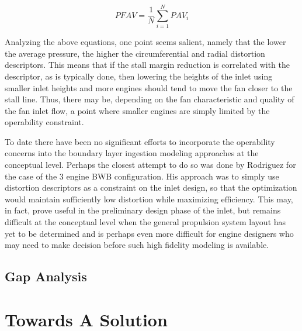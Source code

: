 			\begin{equation}
				PFAV = \frac{1}
					         {N} \sum\limits_{i=1}^{N} PAV_i
			\label{PFAV}\end{equation}%
			
			Analyzing the above equations, one point seems salient, namely that the lower the average pressure, the higher the circumferential and radial distortion descriptors.  This means that if the stall margin reduction is correlated with the descriptor, as is typically done, then lowering the heights of the inlet using smaller inlet heights and more engines should tend to move the fan closer to the stall line.  Thus, there may be, depending on the fan characteristic and quality of the fan inlet flow, a point where smaller engines are simply limited by the operability constraint. 
			
			To date there have been no significant efforts to incorporate the operability concerns into the boundary layer ingestion modeling approaches at the conceptual level.  Perhaps the closest attempt to do so was done by Rodriguez for the case of the 3 engine BWB configuration.  His approach was to simply use distortion descriptors as a constraint on the inlet design, so that the optimization would maintain sufficiently low distortion while maximizing efficiency.  This may, in fact, prove useful in the preliminary design phase of the inlet, but remains difficult at the conceptual level when the general propulsion system layout has yet to be determined and is perhaps even more difficult for engine designers who may need to make decision before such high fidelity modeling is available.
			
			\vspace{25pt}			
				 
\subsection{Gap Analysis}

\section{Towards A Solution}
